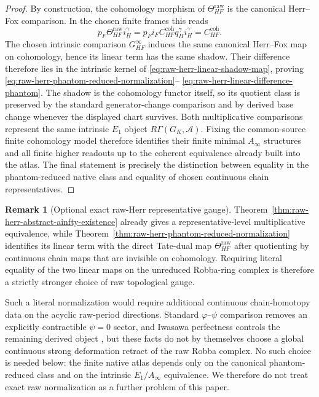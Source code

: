 \documentclass[11pt]{article}
\theoremstyle{definition}
\newtheorem{remark}[theorem]{Remark}
\begin{document}
\begin{proof}
By construction, the cohomology morphism of
$\Theta_{HF}^{\mathrm{raw}}$ is the canonical Herr--Fox comparison.  In the
chosen finite frames this reads
\[
 p_F\Theta_{HF}^{\mathrm{raw}}i_H^\gamma
 =p_Fi_FC_{HF}^{\mathrm{coh}}q_H^\gamma i_H^\gamma
 =C_{HF}^{\mathrm{coh}}.
\]
The chosen intrinsic comparison $G_{HF}^\infty$ induces the same canonical
Herr--Fox map on cohomology, hence its linear term has the same shadow.  Their
difference therefore lies in the intrinsic kernel of
\eqref{eq:raw-herr-linear-shadow-map}, proving
\eqref{eq:raw-herr-phantom-reduced-normalization}--
\eqref{eq:raw-herr-linear-difference-phantom}.  The shadow is the cohomology functor itself, so its quotient class is
preserved by the standard generator-change comparison and by derived base change
whenever the displayed chart survives.  Both multiplicative comparisons
represent the same intrinsic $E_1$ object $R\Gamma(G_K,\mathcal A)$.  Fixing the
common-source finite cohomology model therefore identifies their finite minimal
$A_\infty$ structures and all finite higher readouts up to the coherent
equivalence already built into the atlas.
The final statement is precisely the distinction between equality in the
phantom-reduced native class and equality of chosen continuous chain
representatives.
\end{proof}

\begin{remark}[Optional exact raw-Herr representative gauge]\label{rem:raw-herr-exact-gauge-boundary}
Theorem~\ref{thm:raw-herr-abstract-ainfty-existence} already gives a
representative-level multiplicative equivalence, while
Theorem~\ref{thm:raw-herr-phantom-reduced-normalization} identifies its linear
term with the direct Tate-dual map
$\Theta_{HF}^{\mathrm{raw}}$ after quotienting by continuous chain maps that are
invisible on cohomology.  Requiring literal equality of the two linear maps on
the unreduced Robba-ring complex is therefore a strictly stronger choice of raw
topological gauge.

Such a literal normalization would require additional continuous
chain-homotopy data on the acyclic raw-period directions.  Standard
$\varphi$--$\psi$ comparison removes an explicitly contractible
$\psi=0$ sector, and Iwasawa perfectness controls the remaining derived object
\cite{LiuCohomology,KPXFamilies}, but these facts do not by themselves choose a
global continuous strong deformation retract of the raw Robba complex.  No such
choice is needed below: the finite native atlas depends only on the canonical
phantom-reduced class and on the intrinsic $E_1/A_\infty$ equivalence.  We
therefore do not treat exact raw normalization as a further problem of this
paper.
\end{remark}
\end{document}

